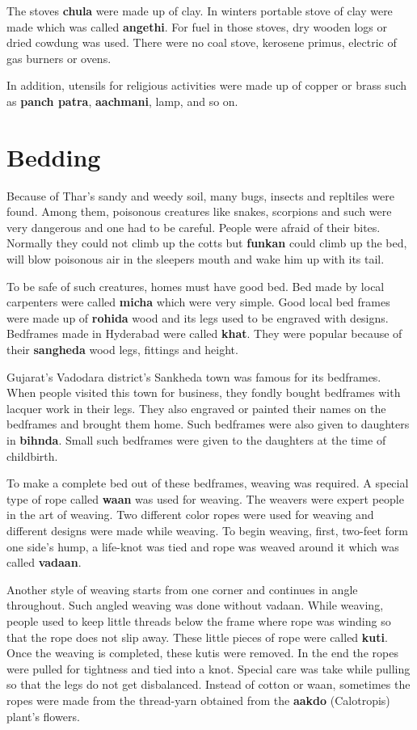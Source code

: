 The stoves \textbf{chula} were made up of clay. In winters portable stove of
clay were made which was called \textbf{angethi}. For fuel in those stoves, dry
wooden logs or dried cowdung was used. There were no coal stove, kerosene
primus, electric of gas burners or ovens.

In addition, utensils for religious activities were made up of copper or brass
such as \textbf{panch patra}, \textbf{aachmani}, lamp, and so on.

\section{Bedding}
Because of Thar's sandy and weedy soil, many bugs, insects and repltiles were
found. Among them, poisonous creatures like snakes, scorpions and such were very
dangerous and one had to be careful. People were afraid of their bites. Normally
they could not climb up the cotts but \textbf{funkan} could climb up the bed,
will blow poisonous air in the sleepers mouth and wake him up with its tail.

To be safe of such creatures, homes must have good bed. Bed made by local
carpenters were called \textbf{micha} which were very simple. Good local bed
frames were made up of \textbf{rohida} wood and its legs used to be engraved with
designs. Bedframes made in Hyderabad were called \textbf{khat}. They were popular
because of their \textbf{sangheda} wood legs, fittings and height.

Gujarat's Vadodara district's Sankheda town was famous for its bedframes. When
people visited this town for business, they fondly bought bedframes with lacquer
work in their legs. They also engraved or painted their names on the bedframes and
brought them home. Such bedframes were also given to daughters in \textbf{bihnda}.
Small such bedframes were given to the daughters at the time of childbirth.

To make a complete bed out of these bedframes, weaving was required. A special
type of rope called \textbf{waan} was used for weaving. The weavers were expert
people in the art of weaving. Two different color ropes were used for weaving
and different designs were made while weaving. To begin weaving, first, two-feet form one
side's hump, a life-knot was tied and rope was weaved around it which was called
\textbf{vadaan}.

Another style of  weaving starts from one corner and continues in angle throughout. Such
angled weaving was done without vadaan. While weaving, people used to keep
little threads below the frame where rope was winding so that the rope does not
slip away. These little pieces of rope were called \textbf{kuti}. Once the
weaving is completed, these kutis were removed. In the end the ropes were pulled
for tightness and tied into a knot. Special care was take while pulling so that
the legs do not get disbalanced. Instead of cotton or waan, sometimes the ropes
were made from the thread-yarn obtained from the \textbf{aakdo} (Calotropis) plant's flowers.

